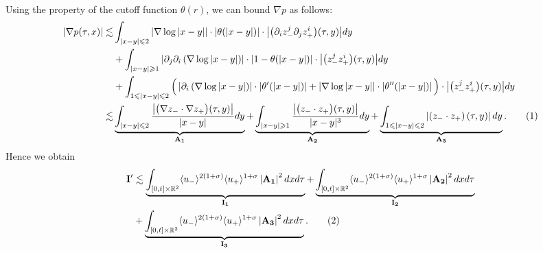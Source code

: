 \documentclass[10pt,reqno]{amsart}
\numberwithin{equation}{section}
\begin{document}
\begin{appendix}
\begin{align*}
\end{align*}
Using the property of the cutoff function $\theta(r)$, we can bound $\nabla p$ as follows:
\begin{align*}
	\left|\nabla p(\tau ,x)\right|
	\lesssim &
	\int_{|x-y|\leqslant 2}
	\left|\nabla\log{|x-y|}\right|\cdot\left|	\theta(|x-y|)\right|\cdot\big|\big(\partial_{i}z^{j}_{-}\partial_{j}z^{i}_{+}\big)(\tau,y)\big|dy\\
	&+\int_{|x-y|\geqslant 1}
	\left|\partial_{j}\partial_{i}\left(\nabla\log{|x-y|}\right)\right|\cdot \left|1-\theta(|x-y|)\right|\cdot 
	\big|\big(z^{j}_{-}z^{i}_{+}\big)(\tau,y)\big|dy\\
	&
	+\int_{1\leqslant |x-y|\leqslant 2}\Big(\left|\partial_{i}\left(\nabla\log{|x-y|}\right)\right|\cdot \left|\theta'(|x-y|)\right|	+\left|\nabla\log{|x-y|}\right|\cdot  \left|\theta''(|x-y|)\right|\Big) \cdot \big| \big(z^{j}_{-}z^{i}_{+}\big)(\tau,y)\big|dy\\
	\lesssim &\underbrace{\int_{|x-y|\leqslant 2}\frac{\big|\big(\nabla z_{-}\cdot \nabla z_{+}\big)(\tau ,y)\big|}{|x-y|^{}}dy}_{\mathbf{A_{1}}}+
	\underbrace{\int _{|x-y|\geqslant 1}\frac{\big|\big(z_{-}\cdot z_{+}\big)(\tau ,y)\big|}{|x-y|^{3}}dy}_{\mathbf{A_{2}}}+\underbrace{\int _{1\leqslant |x-y|\leqslant 2} \left|\left(z_{-}\cdot z_{+}\right)(\tau ,y)\right|dy}_{\mathbf{A_{3}}}.\stepcounter{equation}\tag{\theequation}\label{decomposition of nabla p 2d}
\end{align*}
Hence we obtain 
\begin{align*}
	\mathbf{I'} 
	&\lesssim 
	\underbrace{\int_{[0,t]\times\mathbb{R}^2}\langle u_{-}\rangle^{2(1+\sigma)}\langle u_{+}\rangle^{1+\sigma} \left|\mathbf{A_1}\right|^2dxd\tau}_{\mathbf{I_1}}
	+\underbrace{\int_{[0,t]\times\mathbb{R}^2}\langle u_{-}\rangle^{2(1+\sigma)}\langle u_{+}\rangle^{1+\sigma} \left|\mathbf{A_2}\right|^2dxd\tau}_{\mathbf{I_2}}\\
	&+\underbrace{\int_{[0,t]\times\mathbb{R}^2}\langle u_{-}\rangle^{2(1+\sigma)}\langle u_{+}\rangle^{1+\sigma} \left|\mathbf{A_3}\right|^2dxd\tau}_{\mathbf{I_3}}.\stepcounter{equation}\tag{\theequation}\label{eq:I'}
\end{align*}


\end{appendix}
\end{document}
